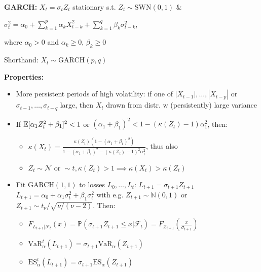 \textbf{GARCH:} $X_t=\sigma_t Z_t$ stationary s.t. $Z_t\sim\text{SWN}(0,1)$ \&

$\sigma_t^2=\alpha_0 + \sum^p_{k=1}\alpha_k X_{t-k}^2+\sum^q_{k=1}\beta_k \sigma^2_{t-k}$,

where $\alpha_0>0$ and $\alpha_k\geq 0$, $\beta_k\geq 0$

Shorthand: $X_t\sim \text{GARCH}(p,q)$

\textbf{Properties:}
\begin{itemize}
    \item More persistent periods of high volatility: if one of $|X_{t-1}|,\dots,|X_{t-p}|$ or $\sigma_{t-1},\dots,\sigma_{t-q}$ large, then $X_t$ drawn from distr. w (persistently) large variance
    \item If $\mathbb{E}[\alpha_1Z_t^2+\beta_1]^2<1$ or $(\alpha_1 + \beta_1)^2<1-(\kappa(Z_t)-1)\alpha_1^2$, then:
    \begin{itemize}
        \item $\kappa(X_t)=\frac{\kappa(Z_t)(1-(\alpha_1+\beta_1)^2)}{1-(\alpha_1+\beta_1)^2-(\kappa(Z_t)-1)^2\alpha_1^2}$, thus also
        \item $Z_t\sim\mathcal{N}\text{ or } \sim t, \kappa(Z_t)>1 \implies \kappa(X_t)>\kappa(Z_t)$
    \end{itemize}
    \item Fit GARCH$(1,1)$ to losses $L_0,\dots,L_t$:
            $L_{t+1}=\sigma_{t+1}Z_{t+1}$
            $L_{t+1}=\alpha_0+\alpha_1\sigma^2_t+\beta_1\sigma_t^2$
        with e.g. $Z_{t+1}\sim\mathbb{N}(0,1)$ or $Z_{t+1}\sim t_{\nu}/\sqrt{\nu/(\nu-2)}$. Then:
    \begin{itemize}
        \item $F_{L_{t+1}|\mathcal{F}_t}(x)=\mathbb{P}(\sigma_{t+1}Z_{t+1}\leq x | \mathcal{F}_t)=F_{Z_{t+1}}(\frac{x}{\sigma_{t+1}})$
        \item $\text{VaR}_{\alpha}^t(L_{t+1})=\sigma_{t+1}\text{VaR}_{\alpha}(Z_{t+1})$
        \item $\text{ES}_{\alpha}^t(L_{t+1})=\sigma_{t+1}\text{ES}_{\alpha}(Z_{t+1})$
    \end{itemize}
\end{itemize}

